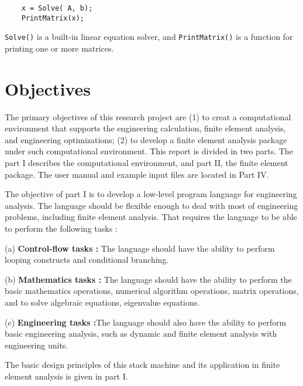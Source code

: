 \begin{verbatim}
    x = Solve( A, b);
    PrintMatrix(x);
\end{verbatim}

\vspace{0.15 in}
\noindent
{\tt Solve()} is a built-in linear equation solver,
and {\tt PrintMatrix()} is a function for printing one or more matrices.

\section{Objectives}
The primary objectives of this research project are (1) to creat a
computational environment that supports the engineering calculation, finite element analysis,
and engineering optimizations; (2) to develop a finite element analysis package under such
computational environment. This report is divided in two parts. The part I
describes the computational environment, and part II, the finite element package. The user manual and
example input files are located in Part IV.

\vspace{0.15 in}\noindent
The objective of part I is to develop a low-level program language
for engineering analysis. The language should be flexible enough to deal
with most of engineering problems, including finite element analysis.
That requires the language to be able to perform the following tasks : 

\begin{description} 
  \item {(a)}
   {\bf Control-flow tasks :} The language should have the ability to perform looping
         constructs and conditional branching.
  \item {(b)}
   {\bf Mathematics tasks :} The language should have the ability to perform the basic
        mathematics operations, numerical algorithm operations, matrix operations,
        and to solve algebraic equations, eigenvalue equations.
  \item {(c)}
   {\bf Engineering tasks :}The language should also have the ability to perform basic
        engineering analysis, such as dynamic and finite element analysis with engineering
        units.
\end{description} 

\noindent
The basic design principles of this stack machine and its application
in finite element analysis is given in part I.


